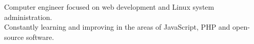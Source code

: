 Computer engineer focused on web development and Linux system administration. \\
Constantly learning and improving in the areas of JavaScript, PHP and open-source software.